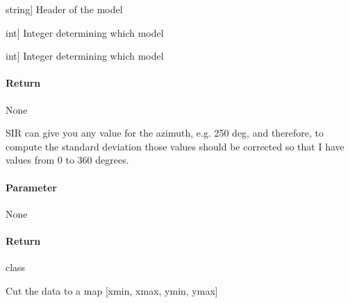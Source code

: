 \documentclass[letterpaper,10pt,english]{sphinxmanual}
\begin{document}
\begin{fulllineitems}
\begin{fulllineitems}
\begin{description}
\sphinxlineitem{Header}{[}string{]}
\sphinxAtStartPar
Header of the model

\sphinxlineitem{x}{[}int{]}
\sphinxAtStartPar
Integer determining which model

\sphinxlineitem{y}{[}int{]}
\sphinxAtStartPar
Integer determining which model

\end{description}


\paragraph{Return}
\label{\detokenize{classes:id10}}
\sphinxAtStartPar
None

\end{fulllineitems}


\begin{fulllineitems}
\label{\detokenize{classes:id0}}
\pysigstartsignatures
{}
\pysigstopsignatures
\sphinxAtStartPar
SIR can give you any value for the azimuth, e.g. \sphinxhyphen{}250 deg, and therefore, to compute the standard deviation
those values should be corrected so that I have values from 0 to 360 degrees.


\paragraph{Parameter}
\label{\detokenize{classes:id11}}
\sphinxAtStartPar
None


\paragraph{Return}
\label{\detokenize{classes:id12}}
\sphinxAtStartPar
class

\end{fulllineitems}


\begin{fulllineitems}
\label{\detokenize{classes:id13}}
\pysigstartsignatures
{}
\pysigstopsignatures
\sphinxAtStartPar
Cut the data to a map {[}xmin, xmax, ymin, ymax{]}



\end{fulllineitems}
\end{fulllineitems}
\end{document}
